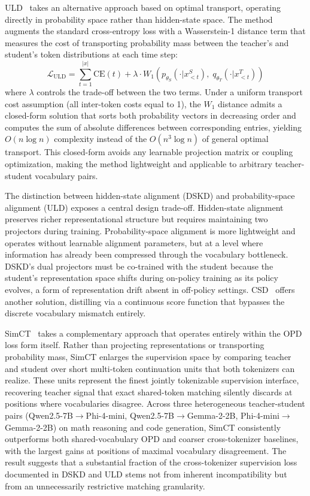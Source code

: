 \documentclass{article} %
\begin{document}
ULD~\citep{2402.12030} takes an alternative approach based on optimal transport, operating directly in probability space rather than hidden-state space. The method augments the standard cross-entropy loss with a Wasserstein-1 distance term that measures the cost of transporting probability mass between the teacher's and student's token distributions at each time step:
\begin{equation}
    \mathcal{L}_{\text{ULD}} = \sum_{t=1}^{|x|} \mathrm{CE}(t) + \lambda \cdot W_1\!\left(p_{\theta_S}(\cdot|x_{<t}^S),\; q_{\theta_T}(\cdot|x_{<t}^T)\right)
\end{equation}
where $\lambda$ controls the trade-off between the two terms. Under a uniform transport cost assumption (all inter-token costs equal to 1), the $W_1$ distance admits a closed-form solution that sorts both probability vectors in decreasing order and computes the sum of absolute differences between corresponding entries, yielding $O(n \log n)$ complexity instead of the $O(n^3 \log n)$ of general optimal transport. This closed-form avoids any learnable projection matrix or coupling optimization, making the method lightweight and applicable to arbitrary teacher-student vocabulary pairs.

The distinction between hidden-state alignment (DSKD) and probability-space alignment (ULD) exposes a central design trade-off. Hidden-state alignment preserves richer representational structure but requires maintaining two projectors during training. Probability-space alignment is more lightweight and operates without learnable alignment parameters, but at a level where information has already been compressed through the vocabulary bottleneck. DSKD's dual projectors must be co-trained with the student because the student's representation space shifts during on-policy training as its policy evolves, a form of representation drift absent in off-policy settings. CSD~\citep{2509.25837} offers another solution, distilling via a continuous score function that bypasses the discrete vocabulary mismatch entirely.

SimCT~\citep{sun2026simct} takes a complementary approach that operates entirely within the OPD loss form itself. Rather than projecting representations or transporting probability mass, SimCT enlarges the supervision space by comparing teacher and student over short multi-token continuation units that both tokenizers can realize. These units represent the finest jointly tokenizable supervision interface, recovering teacher signal that exact shared-token matching silently discards at positions where vocabularies disagree. Across three heterogeneous teacher-student pairs (Qwen2.5-7B$\to$Phi-4-mini, Qwen2.5-7B$\to$Gemma-2-2B, Phi-4-mini$\to$Gemma-2-2B) on math reasoning and code generation, SimCT consistently outperforms both shared-vocabulary OPD and coarser cross-tokenizer baselines, with the largest gains at positions of maximal vocabulary disagreement. The result suggests that a substantial fraction of the cross-tokenizer supervision loss documented in DSKD and ULD stems not from inherent incompatibility but from an unnecessarily restrictive matching granularity.
\end{document}
